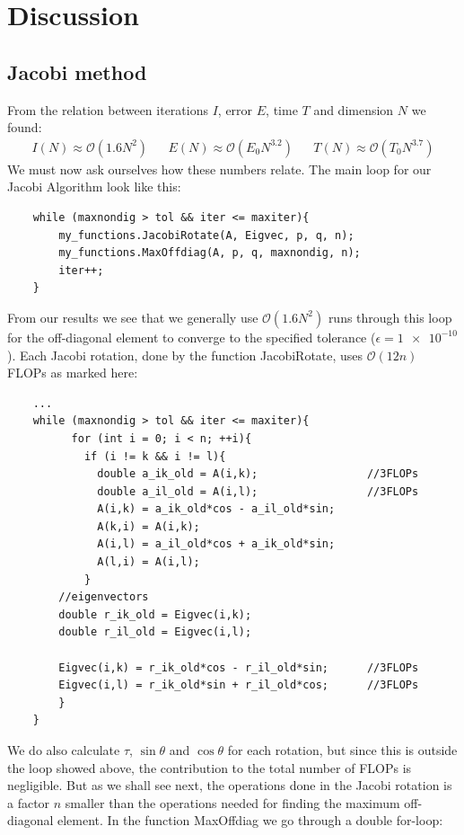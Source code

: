 \documentclass[american,a4paper,12pt]{article}
\begin{document}
\section{Discussion}
\subsection{Jacobi method}
From the relation between iterations $I$, error $E$, time $T$ and dimension $N$ we found:
\begin{align*}
    &I(N) \approx \mathcal{O}(1.6N^2)&  &E(N) \approx \mathcal{O}(E_0N^{3.2})&  &T(N) \approx \mathcal{O}(T_0N^{3.7})&
\end{align*}
We must now ask ourselves how these numbers relate. The main loop for our Jacobi Algorithm look like this:
\begin{verbatim}
    while (maxnondig > tol && iter <= maxiter){
        my_functions.JacobiRotate(A, Eigvec, p, q, n);
        my_functions.MaxOffdiag(A, p, q, maxnondig, n);
        iter++;
    }
\end{verbatim}
From our results we see that we generally use $\mathcal{O}(1.6N^2)$ runs through this loop for the off-diagonal element to converge to the specified tolerance ($\epsilon = \num{1e-10}$). Each Jacobi rotation, done by the function JacobiRotate, uses $\mathcal{O}(12n)$ FLOPs as marked here:
\begin{verbatim}
    ...
    while (maxnondig > tol && iter <= maxiter){
          for (int i = 0; i < n; ++i){
            if (i != k && i != l){
              double a_ik_old = A(i,k);                 //3FLOPs
              double a_il_old = A(i,l);                 //3FLOPs
              A(i,k) = a_ik_old*cos - a_il_old*sin;
              A(k,i) = A(i,k);
              A(i,l) = a_il_old*cos + a_ik_old*sin;
              A(l,i) = A(i,l);
            }
        //eigenvectors
        double r_ik_old = Eigvec(i,k);
        double r_il_old = Eigvec(i,l);
    
        Eigvec(i,k) = r_ik_old*cos - r_il_old*sin;      //3FLOPs
        Eigvec(i,l) = r_ik_old*sin + r_il_old*cos;      //3FLOPs
        }
    }
\end{verbatim}
We do also calculate $\tau$, $\sin{\theta}$ and $\cos{\theta}$ for each rotation, but since this is outside the loop showed above, the contribution to the total number of FLOPs is negligible. But as we shall see next, the operations done in the Jacobi rotation is a factor $n$ smaller than the operations needed for finding the maximum off-diagonal element. In the function MaxOffdiag we go through a double for-loop:
\end{document}
